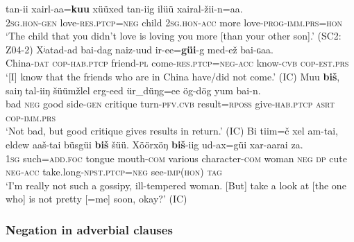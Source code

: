 \documentclass[output=paper,colorlinks,citecolor=brown,chinesefont]{langscibook}
\begin{document}
\ea\label{ex:kha:36}
    \gll tan-ii xairl-aa=\textbf{kuu} xüüxed tan-iig ilüü xairal-žii-n=aa. \\ 
         \textsc{2sg.hon-gen} love-\textsc{res.ptcp=neg} child \textsc{2sg.hon-acc} more love-\textsc{prog-imm.prs=hon} \\
    \glt ‘The child that you didn’t love is loving you more [than your other son].’ (SC2: Z04-2)
\z 
\ea\label{ex:kha:37}
    \gll Xʲatad-ad bai-dag naiz-uud   ir-ee=\textbf{güi}-g med-ež   bai-ɢaa. \\ 
         China-\textsc{dat} \textsc{cop-hab.ptcp} friend\textsc{{}-pl} come-\textsc{res.ptcp=neg-acc} know-\textsc{cvb} \textsc{cop-est.prs}\\
    \glt ‘[I] know that the friends who are in China have/did not come.’ (IC)
\z 
\ea\label{ex:kha:38}
    \gll Muu \textbf{biš}, saiŋ tal-iiŋ šüümžlel   erg-eed ür\_düŋg=ee ög-dög yum bai-n. \\ 
         bad \textsc{neg} good side-\textsc{gen} critique turn-\textsc{pfv.cvb} result=\textsc{rposs} give-\textsc{hab.ptcp} \textsc{asrt} \textsc{cop-imm.prs} \\
    \glt ‘Not bad, but good critique gives results in return.’ (IC)
\z 
\ea\label{ex:kha:39}
    \gll Bi tiim=č xel am-tai, eldew aaš-tai büsgüi \textbf{biš} šüü. Xöörxöŋ \textbf{biš}-iig ud-ax=güi xar-aarai za.\\ 
         \textsc{1sg} such=\textsc{add.foc} tongue mouth-\textsc{com} various character-\textsc{com} woman \textsc{neg} \textsc{dp} cute \textsc{neg-acc} take.long-\textsc{npst.ptcp=neg} see-\textsc{imp(hon)} \textsc{tag} \\
    \glt ‘I’m really not such a gossipy, ill-tempered woman. [But] take a look at [the one who] is not pretty [=me] soon, okay?’ (IC)
\z 
 

\subsubsection{Negation in adverbial clauses}\label{sec:kha:2.4.2}
\largerpage[2]
\end{document}
